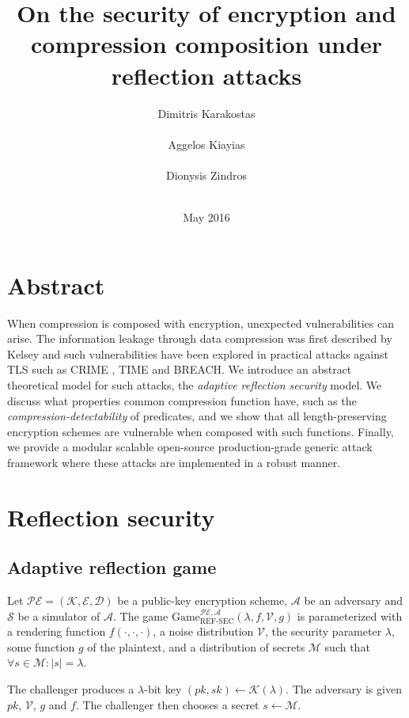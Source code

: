 \documentclass{sig-alternate-05-2015}
\title{On the security of encryption and compression composition under reflection attacks}
\author{
\alignauthor
Dimitris Karakostas\\
       \affaddr{University of Athens}\\
       \email{dimit.karakostas@gmail.com}
\alignauthor
Aggelos Kiayias\\
       \affaddr{University of Athens}\\
       \email{aggelos@di.uoa.gr}
\alignauthor
Dionysis Zindros\\
       \affaddr{University of Athens}\\
       \email{dionyziz@di.uoa.gr}
}
\date{May 2016}
\begin{document}
\maketitle

\section{Abstract}\label{sec:abstract}
When compression is composed with encryption, unexpected vulnerabilities can
arise. The information leakage through data compression was first described by
Kelsey \cite{c13} and such vulnerabilities have been explored in practical
attacks against TLS such as CRIME \cite{c1}, TIME\cite{c2} and BREACH\cite{c3}.
We introduce an abstract theoretical model for such attacks, the
\textit{adaptive reflection security} model. We discuss what properties common
compression function have, such as the \textit{compression-detectability} of
predicates, and we show that all length-preserving encryption schemes are
vulnerable when composed with such functions. Finally, we provide a modular
scalable open-source production-grade generic attack framework where these
attacks are implemented in a robust manner.

\section{Reflection security}\label{sec:refsec}

\subsection{Adaptive reflection game}\label{subsec:refsecgame}

Let $\mathcal{PE} = (\mathcal{K}, \mathcal{E}, \mathcal{D})$ be a public-key
encryption scheme, $\mathcal{A}$ be an adversary and $\mathcal{S}$ be a
simulator of $\mathcal{A}$.  The game
$\text{Game}_{\text{REF-SEC}}^{\mathcal{PE},\mathcal{A}}(\lambda,  f,
\mathcal{V}, g)$ is parameterized with a rendering function $f(\cdot, \cdot,
\cdot)$, a noise distribution $\mathcal{V}$, the security parameter $\lambda$,
some function $g$ of the plaintext, and a distribution of secrets $\mathcal{M}$
such that $\forall s \in \mathcal{M}: |s| = \lambda$.

The challenger produces a $\lambda$-bit key $(pk, sk) \leftarrow
\mathcal{K}(\lambda)$. The adversary is given $pk$, $\mathcal{V}$, $g$ and $f$.
The challenger then chooses a secret $s \leftarrow \mathcal{M}$.
\end{document}
